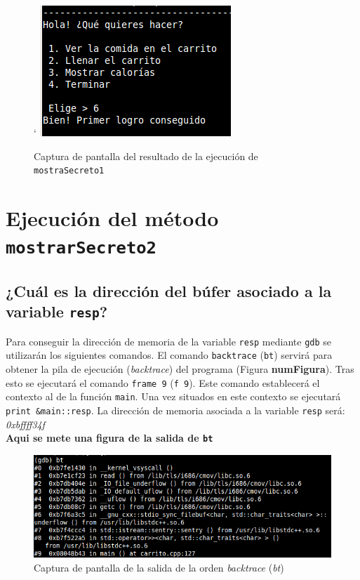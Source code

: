 \documentclass[10pt,a4paper]{article}
\begin{document}
\begin{figure}[h!]`
\centering
\includegraphics[scale=0.8]{images/primer_logro.png}
\caption{Captura de pantalla del resultado de la ejecución de \texttt{mostraSecreto1}}
\label{fig:mostrarSecreto1}
\end{figure}


\section{Ejecución del método \texttt{mostrarSecreto2}}

\subsection{¿Cuál es la dirección del búfer asociado a la variable \texttt{resp}?}

Para conseguir la dirección de memoria de la variable \texttt{resp} mediante \texttt{gdb} se utilizarán los siguientes comandos. El comando \texttt{backtrace} (\texttt{bt}) servirá para obtener la pila de ejecución (\emph{backtrace}) del programa (Figura \textbf{numFigura}). Tras esto se ejecutará el comando \texttt{frame 9} (\texttt{f 9}). Este comando establecerá el contexto al de la función \texttt{main}. Una vez situados en este contexto se ejecutará \texttt{print \&{}main::resp}. La dirección de memoria asociada a la variable \texttt{resp} será: \emph{0xbffff34f}\\

\textbf{Aqui se mete una figura de la salida de \texttt{bt}}\\
\begin{figure}[h!]
\centering
\includegraphics[scale=0.8]{images/bt.png}
\caption{Captura de pantalla de la salida de la orden \emph{backtrace} (\emph{bt})}
\label{fig:bt}
\end{figure}
\end{document}
